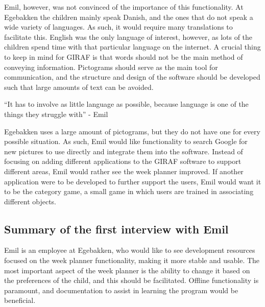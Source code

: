 Emil, however, was not convinced of the importance of this functionality.
At Egebakken the children mainly speak Danish, and the ones that do not speak a wide variety of languages.
As such, it would require many translations to facilitate this.
English was the only language of interest, however, as lots of the children spend time with that particular language on the internet.
A crucial thing to keep in mind for GIRAF is that words should not be the main method of conveying information.
Pictograms should serve as the main tool for communication, and the structure and design of the software should be developed such that large amounts of text can be avoided.
\begin{displayquote}
    ``It has to involve as little language as possible, because language is one of the things they struggle with'' - Emil
\end{displayquote}
Egebakken uses a large amount of pictograms, but they do not have one for every possible situation.
As such, Emil would like functionality to search Google for new pictures to use directly and integrate them into the software.
Instead of focusing on adding different applications to the GIRAF software to support different areas, Emil would rather see the week planner improved.
If another application were to be developed to further support the users, Emil would want it to be the category game, a small game in which users are trained in associating different objects.

\subsection{Summary of the first interview with Emil}
Emil is an employee at Egebakken, who would like to see development resources focused on the week planner functionality, making it more stable and usable.
The most important aspect of the week planner is the ability to change it based on the preferences of the child, and this should be facilitated.
Offline functionality is paramount, and documentation to assist in learning the program would be beneficial.
